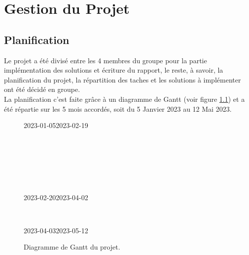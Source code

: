 \chapter{Gestion du Projet}

\section{Planification}
Le projet a été divisé entre les 4 membres du groupe pour la partie implémentation des solutions et écriture du rapport, le reste, à savoir, la planification du projet, la répartition des taches et les solutions à implémenter ont été décidé en groupe.\\
La planification c'est faite grâce à un diagramme de Gantt (voir figure \ref{fig:diagram_gantt}) et a été répartie sur les 5 mois accordés, soit du 5 Janvier 2023 au 12 Mai 2023.

\begin{figure}[!htbp]
\begin{ganttchart}[
	hgrid,
	vgrid,
	inline,
	x unit=4mm,
	time slot format=isodate
	]{2023-01-05}{2023-02-19}
	\\
	\\
	\\
	\\
	\\
\end{ganttchart}
\\
\begin{ganttchart}[
	hgrid,
	vgrid,
	inline,
	x unit=4mm,
	time slot format=isodate
	]{2023-02-20}{2023-04-02}
	\\
\end{ganttchart}
\\
\begin{ganttchart}[
	hgrid,
	vgrid,
	inline,
	x unit=4mm,
	time slot format=isodate
	]{2023-04-03}{2023-05-12}
	\\
\end{ganttchart}
\caption{Diagramme de Gantt du projet.}
\label{fig:diagram_gantt}
\end{figure}

\clearpage